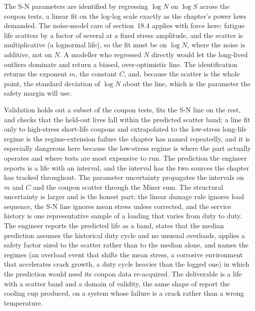  The S-N parameters are identified by
regressing $\log N$ on $\log S$ across the coupon tests, a linear fit on the log-log
scale exactly as the chapter's power laws demanded. The noise-model care of
section~18.4 applies with force here: fatigue life scatters by a factor of several
at a fixed stress amplitude, and the scatter is multiplicative (a lognormal life),
so the fit must be on $\log N$, where the noise is additive, not on $N$. A modeller
who regressed $N$ directly would let the long-lived outliers dominate and return a
biased, over-optimistic line. The identification returns the exponent $m$, the
constant $C$, and, because the scatter is the whole point, the standard deviation
of $\log N$ about the line, which is the parameter the safety margin will use.

 Validation holds
out a subset of the coupon tests, fits the S-N line on the rest, and checks that
the held-out lives fall within the predicted scatter band; a line fit only to
high-stress short-life coupons and extrapolated to the low-stress long-life regime
is the regime-extension failure the chapter has named repeatedly, and it is
especially dangerous here because the low-stress regime is where the part actually
operates and where tests are most expensive to run. The prediction the engineer
reports is a life with an interval, and the interval has the two sources the
chapter has tracked throughout. The parameter uncertainty propagates the intervals
on $m$ and $C$ and the coupon scatter through the Miner sum. The structural
uncertainty is larger and is the honest part: the linear damage rule ignores load
sequence, the S-N line ignores mean stress unless corrected, and the service
history is one representative sample of a loading that varies from duty to duty.
The engineer reports the predicted life as a band, states that the median
prediction assumes the historical duty cycle and no unusual overloads, applies a
safety factor sized to the scatter rather than to the median alone, and names the
regimes (an overload event that shifts the mean stress, a corrosive environment
that accelerates crack growth, a duty cycle heavier than the logged one) in which
the prediction would need its coupon data re-acquired. The deliverable is a life
with a scatter band and a domain of validity, the same shape of report the cooling
cup produced, on a system whose failure is a crack rather than a wrong
temperature.


